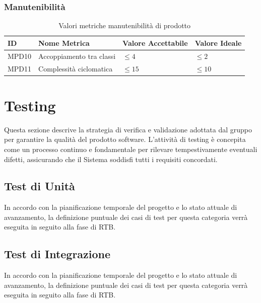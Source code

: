 \documentclass[a4paper,12pt]{article}
\begin{document}
            \subsubsection{Manutenibilità}
            \begin{longtable}{|M{1.5cm}|M{5cm}|M{2.5cm}|M{2.5cm}|}

                \caption{Valori metriche manutenibilità di prodotto} \\
                \hline
                \textbf{ID} & \textbf{Nome Metrica} & \textbf{Valore Accettabile} & \textbf{Valore Ideale} \\
                \hline
                \endhead

                    MPD10 & Accoppiamento tra classi & $\le4$ & $\le2$ \\
                    \hline

                    MPD11 & Complessità ciclomatica & $\le15$ & $\le10$ \\
                    \hline

            \end{longtable}
            
\newpage
    \section{Testing}

    Questa sezione descrive la strategia di verifica e validazione adottata dal gruppo per garantire la qualità del prodotto software.
    L'attività di testing è concepita come un processo continuo e fondamentale per rilevare tempestivamente eventuali difetti, assicurando che il Sistema soddisfi tutti i requisiti concordati.

        \subsection{Test di Unità}

        In accordo con la pianificazione temporale del progetto e lo stato attuale di avanzamento, la definizione puntuale dei casi di test per questa categoria verrà eseguita in seguito alla fase di RTB.

        \subsection{Test di Integrazione}

        In accordo con la pianificazione temporale del progetto e lo stato attuale di avanzamento, la definizione puntuale dei casi di test per questa categoria verrà eseguita in seguito alla fase di RTB.
\end{document}
